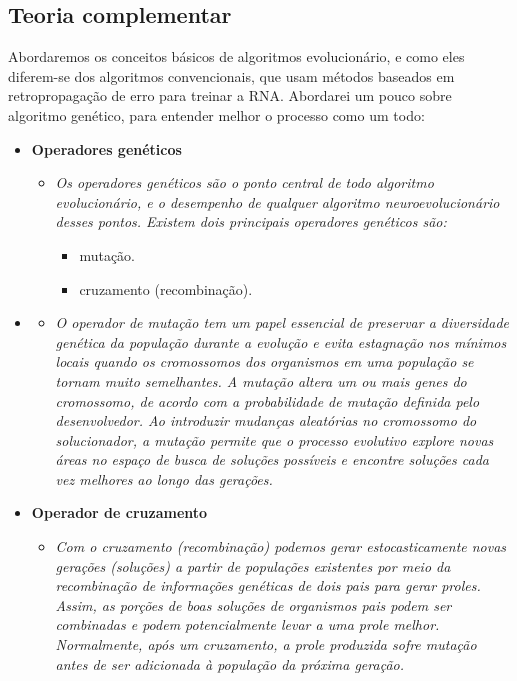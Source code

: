 \subsection{\textbf{Teoria complementar}}\label{sec:ANN}
%
Abordaremos os conceitos básicos de algoritmos evolucionário, e como eles diferem-se dos algoritmos convencionais, que usam métodos baseados em retropropagação de erro para treinar a RNA.
Abordarei um pouco sobre algoritmo genético, 
para entender melhor o processo como um todo: 
\begin{itemize}
\item {\bfseries {Operadores genéticos}}
\begin{itemize}
    \item \emph{ Os operadores genéticos são o ponto central de todo algoritmo evolucionário, e o desempenho de qualquer algoritmo neuroevolucionário  desses pontos. Existem dois principais operadores genéticos são:}
                \begin{itemize}
                    \item mutação.
                    \item cruzamento (recombinação).
                \end{itemize}
\end{itemize}
\item {}
\begin{itemize}
    \item \emph{O operador de mutação tem um papel essencial de preservar a diversidade genética da população durante a evolução e evita estagnação nos mínimos locais quando os cromossomos dos organismos em uma população se tornam muito semelhantes.
    A mutação altera um ou mais genes do cromossomo, de acordo com a probabilidade de mutação definida pelo desenvolvedor. Ao introduzir mudanças aleatórias no cromossomo do solucionador, a mutação permite que o processo evolutivo explore novas áreas no espaço de busca de soluções possíveis e encontre soluções cada vez melhores ao longo das gerações.}
\end{itemize}

\item {\textbf{Operador de cruzamento}}
\begin{itemize}
    \item \emph{Com o cruzamento (recombinação) podemos gerar estocasticamente novas gerações (soluções) a partir de populações existentes por meio da recombinação de informações genéticas de dois pais para gerar proles. Assim, as porções de boas soluções de organismos pais podem ser combinadas e podem potencialmente levar a uma prole melhor. Normalmente, após um cruzamento, a prole produzida sofre mutação antes de ser adicionada à população da próxima geração.}\\
\end{itemize}


\end{itemize}
